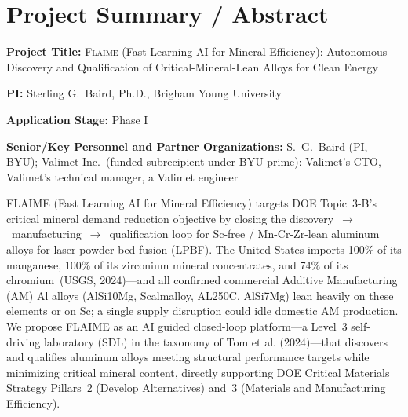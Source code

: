 \documentclass[11pt,letterpaper]{article}
\newif\ifsubmission
\newcommand{\guidance}[1]{\todo[inline,color=blue!20]{#1}}
\newcommand{\required}[1]{\todo[inline,color=red!25,bordercolor=red!60]{%
  \textbf{REQUIRED:} #1}}
\newcommand{\flaime}{\textsc{Flaime}}
\newcommand{\projecttitle}{\flaime{} (Fast Learning AI for Mineral
Efficiency): Autonomous Discovery and Qualification of
Critical-Mineral-Lean Alloys for Clean Energy}
\begin{document}
\ifsubmission\else  %
%
%
\section*{Project Summary / Abstract}
\label{sec:abstract}
\thispagestyle{empty}



\textbf{Project Title:} \projecttitle{}

\textbf{PI:} Sterling G.\ Baird, Ph.D., Brigham Young University

\textbf{Application Stage:} Phase I

\textbf{Senior/Key Personnel and Partner Organizations:}
S.\ G.\ Baird (PI, BYU);
Valimet Inc.\ (funded subrecipient under BYU prime): Valimet's CTO, Valimet's technical manager, a Valimet engineer

\bigskip

FLAIME (Fast Learning AI for Mineral Efficiency) targets DOE Topic~3-B's
critical mineral demand reduction objective by closing the
discovery~$\to$~manufacturing~$\to$~qualification loop for
Sc-free / Mn-Cr-Zr-lean aluminum alloys for laser powder bed fusion
(LPBF). The United States imports 100\% of its manganese, 100\% of its
zirconium mineral concentrates, and 74\% of its chromium~(USGS, 2024)---and
all confirmed commercial Additive Manufacturing (AM) Al alloys (AlSi10Mg, Scalmalloy, AL250C,
AlSi7Mg) lean heavily on these elements or on Sc; a single supply disruption
could idle domestic AM production. We propose FLAIME as an AI guided
closed-loop platform---a Level~3 self-driving laboratory (SDL) in the
taxonomy of Tom et al. (2024)---that discovers and qualifies aluminum alloys
meeting structural performance targets while minimizing critical mineral
content, directly supporting DOE Critical Materials Strategy Pillars~2
(Develop Alternatives) and~3 (Materials and Manufacturing Efficiency).
\end{document}
